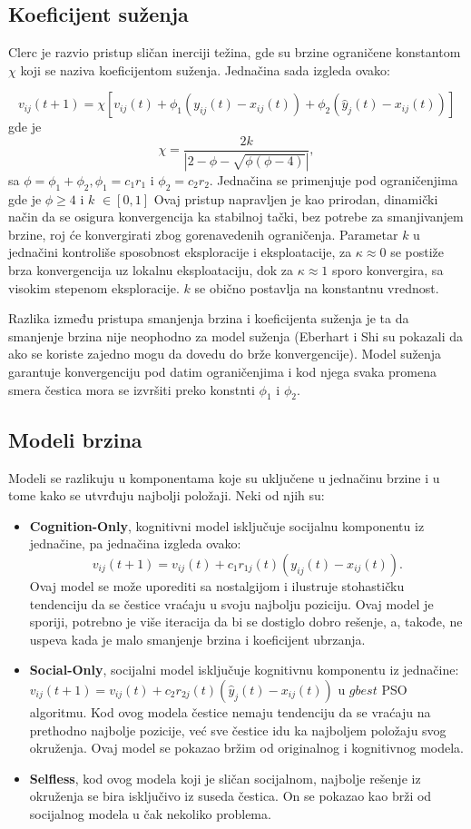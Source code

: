 \documentclass[a4paper]{article}
\begin{document}
\subsection{Koeficijent suženja}
Clerc je razvio pristup sličan inerciji težina, gde su brzine ograničene konstantom $\chi$ koji se naziva koeficijentom suženja. Jednačina sada izgleda ovako:

\[v_{ij} (t + 1) = \chi[v_{ij} (t) + \phi_1 (y_{ij} (t) - x_{ij} (t)) + \phi_2 (\hat{y}_j (t) - x_{ij} (t))]\]
gde je $$\chi = \frac{2k}{|2-\phi-\sqrt{\phi(\phi-4)}|},$$sa $\phi = \phi_1 +  \phi_2 , \phi_1 = c_1r_1$ i $\phi_2 = c_2r_2$.
Jednačina se primenjuje pod ograničenjima gde je $\phi \geq 4$ i $k$ $\in [0, 1]$
Ovaj pristup napravljen je kao prirodan, dinamički način da se osigura konvergencija ka stabilnoj tački, bez potrebe za smanjivanjem brzine, roj će konvergirati zbog gorenavedenih ograničenja.
Parametar $k$ u jednačini kontroliše sposobnost eksploracije i eksploatacije, za $κ ≈ 0$ se postiže brza konvergencija uz lokalnu eksploataciju, dok za  $κ ≈ 1$ sporo konvergira, sa visokim stepenom eksploracije. $k$ se obično postavlja na konstantnu vrednost.

Razlika između pristupa smanjenja brzina i koeficijenta suženja je ta da smanjenje brzina nije neophodno za model suženja (Eberhart i Shi su pokazali da ako se koriste zajedno mogu da dovedu do brže konvergencije). Model suženja garantuje konvergenciju pod datim ograničenjima i kod njega svaka promena smera čestica mora se izvršiti preko konstnti $\phi_1$ i $\phi_2$.

\subsection{Modeli brzina}
Modeli se razlikuju u komponentama koje su uključene u jednačinu brzine i u tome kako se utvrđuju najbolji položaji. Neki od njih su:
\begin{itemize}
    \item \textbf{Cognition-Only}, kognitivni model isključuje socijalnu komponentu iz jednačine, pa jednačina izgleda ovako: $$v_{ij} (t + 1) = v_{ij} (t) + c_1r_{1j} (t)(y_{ij} (t) - x_{ij} (t)).$$ Ovaj model se može uporediti sa nostalgijom i ilustruje stohastičku tendenciju  da se čestice vraćaju u svoju najbolju poziciju. Ovaj model je sporiji, potrebno je više iteracija da bi se dostiglo dobro rešenje, a, takođe, ne uspeva kada je malo smanjenje brzina i koeficijent ubrzanja.
    \item \textbf{Social-Only}, socijalni model isključuje kognitivnu komponentu iz jednačine: $v_{ij} (t + 1) = v_{ij} (t) + c_2r_{2j} (t)(\hat{y}_j (t) - x_{ij} (t))$ u $gbest$ PSO algoritmu. Kod ovog modela čestice nemaju tendenciju da se vraćaju na prethodno najbolje pozicije, već sve čestice idu ka najboljem položaju svog okruženja. Ovaj model se pokazao bržim od originalnog i kognitivnog modela.
    \item \textbf{Selfless}, kod ovog modela koji je sličan socijalnom, najbolje rešenje iz okruženja se bira isključivo iz suseda čestica. On se pokazao kao brži od socijalnog modela u čak nekoliko problema.
\end{itemize}
\end{document}
